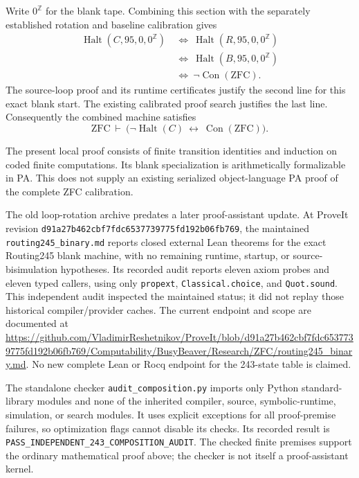 Write $0^{\mathbb Z}$ for the blank tape.  Combining this section with
the separately established rotation and baseline calibration gives
\[
\begin{aligned}
\operatorname{Halt}(C,95,0,0^{\mathbb Z})
&\ \Longleftrightarrow\
\operatorname{Halt}(R,95,0,0^{\mathbb Z})\\
&\ \Longleftrightarrow\
\operatorname{Halt}(B,95,0,0^{\mathbb Z})\\
&\ \Longleftrightarrow\ \neg\operatorname{Con}(\mathrm{ZFC}).
\end{aligned}
\]
The source-loop proof and its runtime certificates justify the second
line for this exact blank start.  The existing calibrated proof search
justifies the last line.  Consequently the combined machine satisfies
\[
 \mathrm{ZFC}\ \vdash\
 \bigl(\neg\operatorname{Halt}(C)\ \longleftrightarrow\
       \operatorname{Con}(\mathrm{ZFC})\bigr).
\]

The present local proof consists of finite transition identities and
induction on coded finite computations.  Its blank specialization is
arithmetically formalizable in PA.  This does not supply an existing
serialized object-language PA proof of the complete ZFC calibration.

The old loop-rotation archive predates a later proof-assistant update.
At ProveIt revision
\texttt{d91a27b462cbf7fdc6537739775fd192b06fb769}, the maintained
\texttt{routing245\_binary.md} reports closed external Lean theorems for
the exact Routing245 blank machine, with no remaining runtime, startup,
or source-bisimulation hypotheses.  Its recorded audit reports eleven
axiom probes and eleven typed callers, using only
\texttt{propext}, \texttt{Classical.choice}, and \texttt{Quot.sound}.
This independent audit inspected the maintained status; it did not
replay those historical compiler/provider caches.
The current endpoint and scope are documented at
\url{https://github.com/VladimirReshetnikov/ProveIt/blob/d91a27b462cbf7fdc6537739775fd192b06fb769/Computability/BusyBeaver/Research/ZFC/routing245_binary.md}.
No new complete Lean or Rocq endpoint for the 243-state table is claimed.

The standalone checker \texttt{audit\_composition.py} imports only Python
standard-library modules and none of the inherited compiler, source,
symbolic-runtime, simulation, or search modules.  It uses explicit
exceptions for all proof-premise failures, so optimization flags cannot
disable its checks.  Its recorded result is
\texttt{PASS\_INDEPENDENT\_243\_COMPOSITION\_AUDIT}.  The checked finite
premises support the ordinary mathematical proof above; the checker is
not itself a proof-assistant kernel.
